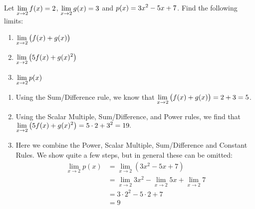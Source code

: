 \begin{example} \label{Ex:1.1.Eg3}
Let $\displaystyle \lim_{x\to 2} f(x)=2$, $\displaystyle  \lim_{x\to 2} g(x) = 3$ and $\displaystyle p(x) = 3x^2-5x+7$. Find the following limits:

\begin{enumerate}[1)]
\item $\displaystyle \lim_{x\to 2} \big(f(x) + g(x)\big)$
\item $\displaystyle \lim_{x\to 2} \big(5f(x) + g(x)^2\big)$
\item $\displaystyle \lim_{x\to 2} p(x)$
\end{enumerate}

\solution

\begin{enumerate}[1)]
\item Using the Sum/Difference rule, we know that \newline $\displaystyle \lim_{x\to 2} \big(f(x) + g(x)\big) = 2+3 =5$.
\item Using the Scalar Multiple, Sum/Difference, and Power rules, we find that $\displaystyle \lim_{x\to 2} \big(5f(x) + g(x)^2\big) = 5\cdot 2 + 3^2 = 19.$
\item Here we combine the Power, Scalar Multiple, Sum/Difference and Constant Rules. We show quite a few steps, but in general these can be omitted:
\begin{align*}
\lim_{x\to 2} p(x) &= \lim_{x\to 2} (3x^2-5x+7) \\
&= \lim_{x\to 2} 3x^2-\lim_{x\to 2} 5x+\lim_{x\to 2}7 \\
&= 3\cdot 2^2 - 5\cdot 2+7 \\
&= 9
\end{align*}
\end{enumerate}
\end{example}
